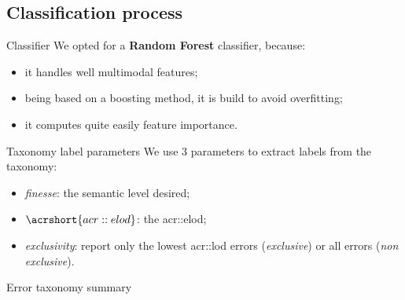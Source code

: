 \documentclass[export]{beamer}
\begin{document}
        \subsection{Classification process}
            \begin{frame}{Classifier}
                We opted for a \textbf{Random Forest} classifier, because:
                \begin{itemize}[label=$\blacktriangleright$, font=\color{IGNGreen}]
                    \item<1-> it handles well multimodal features;
                    \item<2-> being based on a boosting method, it is build to avoid overfitting;
                    \item<3-> it computes quite easily feature importance.
                \end{itemize}
            \end{frame}
            \begin{frame}{Taxonomy label parameters}
                We use $3$ parameters to extract labels from the taxonomy:
                \begin{itemize}[label=$\blacktriangleright$, font=\color{IGNGreen}]
                    \item<1-> \emph{finesse}: the semantic level desired;
                    \item<2-> $\acrshort{acr::elod}$: the \acrlong{acr::elod};
                    \item<3-> \emph{exclusivity}: report only the lowest \acrshort{acr::lod} errors (\emph{exclusive}) or all errors (\emph{non exclusive}).
                \end{itemize}
            \end{frame}
            \begin{frame}{Error taxonomy summary}
                \begin{figure}
                    
                \end{figure}
            \end{frame}
\end{document}
